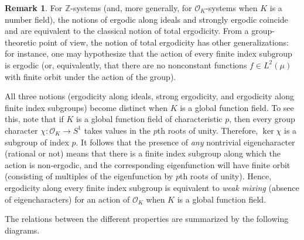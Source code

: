 \documentclass{amsart}
\theoremstyle{definition}
\newtheorem{remark}[theorem]{Remark}
\numberwithin{equation}{section}
\newcommand{\Z}{\mathbb{Z}}
\newcommand{\mO}{\mathcal{O}}
\begin{document}
\begin{remark} \label{rem: total ergodicity}
    For $\Z$-systems (and, more generally, for $\mO_K$-systems when $K$ is a number field), the notions of ergodic along ideals and strongly ergodic coincide and are equivalent to the classical notion of total ergodicity.
    From a group-theoretic point of view, the notion of total ergodicity has other generalizations: for instance, one may hypothesize that the action of every finite index subgroup is ergodic (or, equivalently, that there are no nonconstant functions $f \in L^2(\mu)$ with finite orbit under the action of the group).

    All three notions (ergodicity along ideals, strong ergodicity, and ergodicity along finite index subgroups) become distinct when $K$ is a global function field.
    To see this, note that if $K$ is a global function field of characteristic $p$, then every group character $\chi : \mO_K \to S^1$ takes values in the $p$th roots of unity.
    Therefore, $\ker{\chi}$ is a subgroup of index $p$.
    It follows that the presence of \emph{any} nontrivial eigencharacter (rational or not) means that there is a finite index subgroup along which the action is non-ergodic, and the corresponding eigenfunction will have finite orbit (consisting of multiples of the eigenfunction by $p$th roots of unity).
    Hence, ergodicity along every finite index subgroup is equivalent to \emph{weak mixing} (absence of eigencharacters) for an action of $\mO_K$ when $K$ is a global function field.

    The relations between the different properties are summarized by the following diagrams.


\end{remark}
\end{document}
